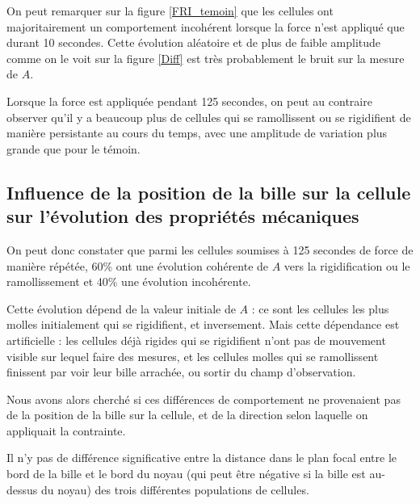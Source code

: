 On peut remarquer sur la figure \ref{FRI_temoin} que les cellules ont majoritairement un comportement incohérent lorsque la force n'est appliqué que durant 10 secondes.
Cette évolution aléatoire et de plus de faible amplitude comme on le voit sur la figure \ref{Diff} est très probablement le bruit sur la mesure de $A$. 

Lorsque la force est appliquée pendant 125 secondes, on peut au contraire observer qu'il y a beaucoup plus de cellules qui se ramollissent ou se rigidifient de manière persistante au cours du temps, avec une amplitude de variation plus grande que pour le témoin. 

\subsection{Influence de la position de la bille sur la cellule sur l'évolution des propriétés mécaniques}

On peut donc constater que parmi les cellules soumises à 125 secondes de force de manière répétée, 60\% ont une évolution cohérente de $A$ vers la rigidification ou le ramollissement et 40\% une évolution incohérente. 

Cette évolution dépend de la valeur initiale de $A$ : ce sont les cellules les plus molles initialement qui se rigidifient, et inversement. Mais cette dépendance est artificielle : les cellules déjà rigides qui se rigidifient n'ont pas de mouvement visible sur lequel faire des mesures, et les cellules molles qui se ramollissent finissent par voir leur bille arrachée, ou sortir du champ d'observation. 

Nous avons alors cherché si ces différences de comportement ne provenaient pas de la position de la bille sur la cellule, et de la direction selon laquelle on appliquait la contrainte. 

Il n'y pas de différence significative entre la distance dans le plan focal entre le bord de la bille et le bord du noyau (qui peut être négative si la bille est au-dessus du noyau) des trois différentes populations de cellules. 


